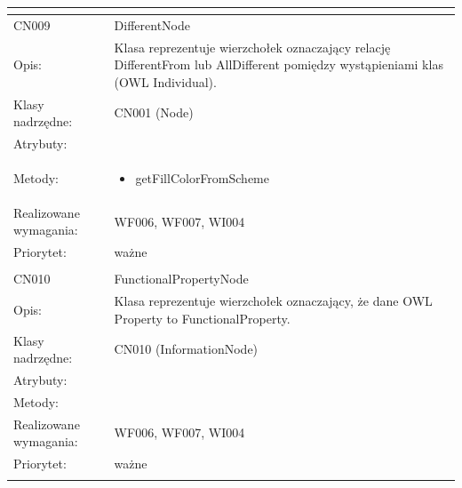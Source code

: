 \documentclass[a4paper,10pt]{article}
\begin{document}
\begin{center}
\begin{longtable}{|m{3cm}|m{9cm}|}
\multicolumn{2}{c}{} \\
 \hline

CN009 & DifferentNode \\ \hline
Opis: & Klasa reprezentuje wierzchołek oznaczający relację DifferentFrom lub AllDifferent pomiędzy wystąpieniami klas (OWL Individual).    \\ \hline
Klasy nadrzędne: & CN001 (Node)       \\ \hline
Atrybuty: & %
 \\ \hline
Metody: & \begin{itemize}
 \item getFillColorFromScheme
\end{itemize}
  \\ \hline
Realizowane wymagania: & WF006, WF007, WI004 \\ \hline
Priorytet: & ważne  \\ \hline

\multicolumn{2}{c}{} \\
 \hline

CN010 & FunctionalPropertyNode \\ \hline
Opis: & Klasa reprezentuje wierzchołek oznaczający, że dane OWL Property to FunctionalProperty.  \\ \hline
Klasy nadrzędne: & CN010 (InformationNode)     \\ \hline
Atrybuty: & %
 \\ \hline
Metody: & %
  \\ \hline
Realizowane wymagania: & WF006, WF007, WI004 \\ \hline
Priorytet: & ważne  \\ \hline

\multicolumn{2}{c}{} \\
 \hline


\end{longtable}
\end{center}
\end{document}
